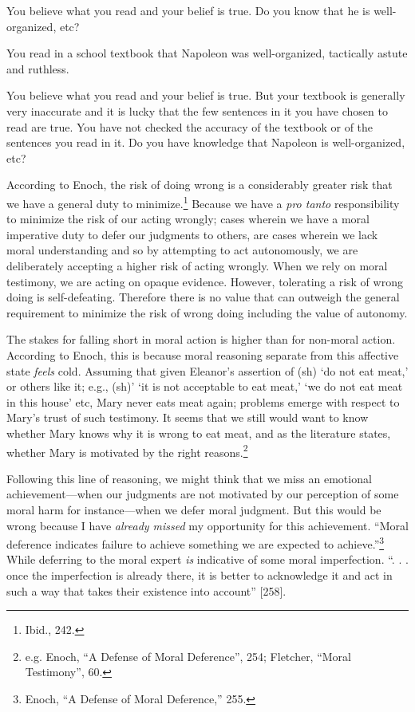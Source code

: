 \documentclass[phdthesis,12pt,final,a4paper]{wuthesis}
\theoremstyle{definition}
\theoremstyle{definition}
\theoremstyle{definition}
\theoremstyle{definition}
\theoremstyle{remark}
\begin{document}
You believe what you read and your belief is true. Do you know that he is well-organized, etc?

You read in a school textbook that Napoleon was well-organized, tactically astute and ruthless.

You believe what you read and your belief is true. But your textbook is generally very inaccurate and it is lucky that the few sentences in it you have chosen to read are true. You have not checked the accuracy of the textbook or of the sentences you read in it. Do you have knowledge that Napoleon is well-organized, etc?

According to Enoch, the risk of doing wrong is a considerably greater risk that we have a general duty to minimize.\footnote{Ibid., 242.} Because we have a \emph{pro tanto} responsibility to minimize the risk of our acting wrongly; cases wherein we have a moral imperative duty to defer our judgments to others, are cases wherein we lack moral understanding and so by attempting to act autonomously, we are deliberately accepting a higher risk of acting wrongly. When we rely on moral testimony, we are acting on opaque evidence. However, tolerating a risk of wrong doing is self-defeating. Therefore there is no value that can outweigh the general requirement to minimize the risk of wrong doing including the value of autonomy.

The stakes for falling short in moral action is higher than for non-moral action. According to Enoch, this is because moral reasoning separate from this affective state \emph{feels} cold. Assuming that given Eleanor's assertion of (sh) `do not eat meat,' or others like it; e.g., (sh)' `it is not acceptable to eat meat,' `we do not eat meat in this house' etc, Mary never eats meat again; problems emerge with respect to Mary's trust of such testimony. It seems that we still would want to know whether Mary knows why it is wrong to eat meat, and as the literature states, whether Mary is motivated by the right reasons.\footnote{e.g. Enoch, {``A {Defense} of {Moral Deference}''}, 254; Fletcher, {``Moral {Testimony}''}, 60.}

Following this line of reasoning, we might think that we miss an emotional achievement---when our judgments are not motivated by our perception of some moral harm for instance---when we defer moral judgment. But this would be wrong because I have \emph{already missed} my opportunity for this achievement. ``Moral deference indicates failure to achieve something we are expected to achieve.''\footnote{Enoch, {``A {Defense} of {Moral Deference},''} 255.} While deferring to the moral expert \emph{is} indicative of some moral imperfection. ``. . . once the imperfection is already there, it is better to acknowledge it and act in such a way that takes their existence into account'' {[}258{]}.
\end{document}
